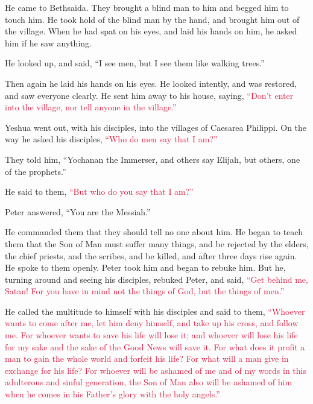 \myverse{}He came to Bethsaida. They brought a blind man to him and begged
him to touch him.
\myverse{}He took hold of the blind man by the hand, and brought him out of the village.
When he had spat on his eyes, and laid his hands on him, he asked him if he saw anything.

\myverse{}He looked up, and said, “I see men, but I see them like walking
trees.”

\myverse{}Then again he laid his hands on his eyes. He looked intently,
and was restored, and saw everyone clearly.
\myverse{}He sent him away to his house, saying,
\textcolor{crimson}{“Don’t enter into the village, nor tell anyone in the village.”}

\myverse{}Yeshua went out, with his disciples, into the villages of Caesarea
Philippi. On the way he asked his disciples,
\textcolor{crimson}{“Who do men say that I am?”
}

\myverse{}They told him, “Yochanan the Immerser, and others say Elijah,
but others, one of the prophets.”

\myverse{}He said to them,
\textcolor{crimson}{“But who do you say that I am?”}

Peter answered, “You are the Messiah.”

\myverse{}He commanded them that they should tell no one about him.
\myverse{}He began to teach them that the Son of Man must suffer many things, and be
rejected by the elders, the chief priests, and the scribes, and be killed, and after three days rise again.
\myverse{}He spoke to them openly. Peter took him and began to rebuke him.
\myverse{}But he, turning around and seeing his disciples, rebuked Peter, and said,
\textcolor{crimson}{“Get behind me, Satan! For you have in mind not the things of God, but the things of men.”}

\myverse{}He called the multitude to himself with his disciples and said
to them,
\textcolor{crimson}{“Whoever wants to come after me, let him deny himself, and take up his cross, and follow me.
}
\myverse{}\textcolor{crimson}{For whoever wants to save his life will lose it; and whoever will lose
	his life for my sake and the sake of the Good News will save it.
}
\myverse{}\textcolor{crimson}{For what does it profit a man to gain the whole world and forfeit his
	life?
}
\myverse{}\textcolor{crimson}{For what will a man give in exchange for his life?
}
\myverse{}\textcolor{crimson}{For whoever will be ashamed of me and of my words in this adulterous and
	sinful generation, the Son of Man also will be ashamed of him when he comes in his Father’s glory with
	the holy angels.”}


